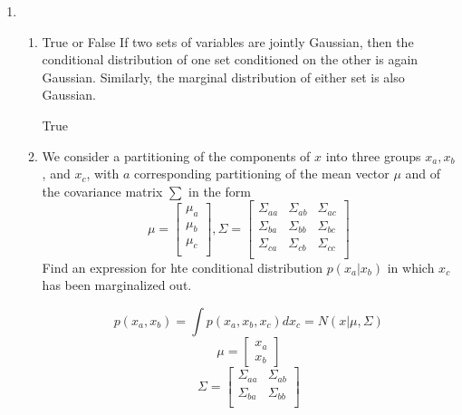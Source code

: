 \documentclass[a4paper]{article}
\begin{document}
	\courseheader
	\begin{enumerate}
		\setlength{\itemsep}{3\parskip}
		
		\item
		\begin{enumerate}
			\item
			True or False If two sets of variables are jointly Gaussian, then the conditional distribution of one set conditioned on the other is again Gaussian. Similarly, the marginal distribution of either set is also Gaussian.
			\begin{solution}
				True
			\end{solution}
			\item
			We consider a partitioning of the components of $x$ into three groups $x_a,x_b$, and $x_c$, with $a$ corresponding partitioning of the mean vector $\mu$ and of the covariance matrix $\sum$ in the form
			$$\mu=\begin{bmatrix}
			\mu_a\\
			\mu_b\\
			\mu_c\\
			\end{bmatrix}
			,
			\Sigma=\begin{bmatrix}
			\Sigma_{aa} & \Sigma_{ab} & \Sigma_{ac}\\
			\Sigma_{ba} & \Sigma_{bb} & \Sigma_{bc}\\
			\Sigma_{ca} & \Sigma_{cb} & \Sigma_{cc}\\
			\end{bmatrix}
			$$
			Find an expression for hte conditional distribution $p(x_a|x_b)$ in which $x_c$ has been marginalized out.
			\begin{solution}
				\begin{equation*}
					p(x_a,x_b) = \int p(x_a,x_b,x_c)dx_c=N(x|\mu,\Sigma)
				\end{equation*}
				\begin{equation*}
					\mu=\begin{bmatrix}
					x_a\\
					x_b
					\end{bmatrix}
				\end{equation*}
				\begin{equation*}
					\Sigma=\begin{bmatrix}
					\Sigma_{aa}&\Sigma_{ab}\\
					\Sigma_{ba}&\Sigma_{bb}\\
					\end{bmatrix}
				\end{equation*}

\end{solution}
\end{enumerate}
\end{enumerate}
\end{document}
